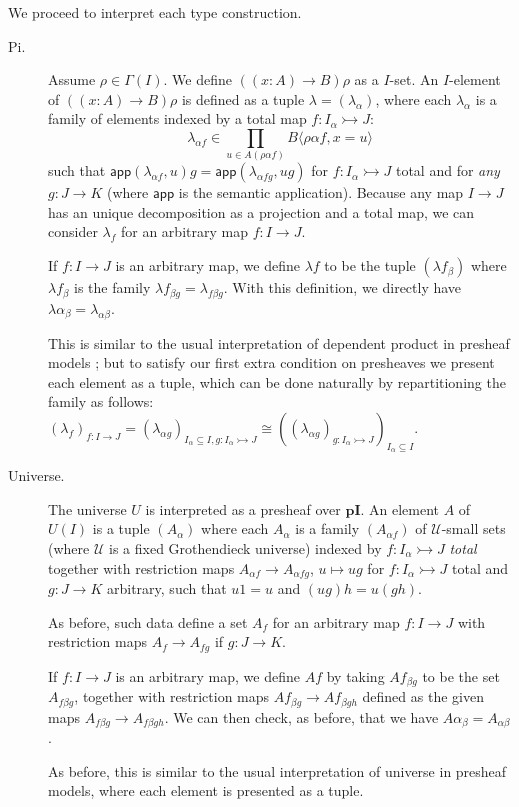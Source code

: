 \documentclass[english]{PaperTools/latex/entcs}
\theoremstyle{plain}
\theoremstyle{definition}
\theoremstyle{remark}
\def\pI{\ensuremath{\mathbf{pI}}}
\def\app#1#2{\mathsf{app}(#1,#2)}
\begin{document}
\smallskip
We proceed to interpret each type construction.
\begin{description}
  \item[\sc Pi.]
    Assume $ρ ∈ Γ(I)$. We define $((x:A) → B)ρ$ as a $I$-set.
    An $I$-element of $((x:A) → B)ρ$ is defined as a tuple $λ = (λ_α)$,
    where each $λ_α$ is a family of elements indexed by a total map $f : I_α ↣ J$:
    $$λ_{α f} ∈ \prod_{u ∈ A(ραf)} B⟨ραf,x=u⟩$$
    such that
    $\app{λ_{αf}}{u} g = \app{λ_{α fg}}{ug}$ for $f : I_α ↣ J$ total and
    for \emph{any} $g : J → K$ (where $\mathsf{app}$ is the semantic
    application).
    Because any map $I → J$ has an unique decomposition as a projection and a total
    map, we can consider $λ_f$ for an arbitrary map $f : I → J$.

    If $f : I → J$ is an arbitrary map, we define $λ f$ to be the tuple
    $(λf_β)$ where $λf_β$ is the family $λf_{βg} = λ_{fβg}$.
    With this definition, we directly have $λα_{β} = λ_{αβ}$.

    This is similar to the usual interpretation of dependent product in
    presheaf models \citep{Hofmann97syntaxand,bezem2014model}; but to
    satisfy our first extra condition on presheaves we present
    each element as a tuple, which can be done naturally by repartitioning
    the family as follows:
    $(λ_f)_{f : I → J} = (λ_{αg})_{I_α ⊆ I, g : I_α ↣ J} ≅
     ((λ_{αg})_{g : I_α ↣ J})_{I_α ⊆ I}$.


  \item[\sc Universe.]
    The universe $U$ is interpreted as a presheaf over \pI. An element $A$ of
    $U(I)$ is a tuple $(A_α)$ where each $A_α$ is a family $(A_{α f})$ of
    $\mathcal U$-small sets (where $\mathcal U$ is a fixed Grothendieck universe)
    indexed by $f : I_α ↣ J$ \emph{total} together with restriction
    maps $A_{α f} → A_{α fg}$, $u ↦ ug$ for $f : I_α ↣ J$ total
    and $g : J → K$ arbitrary, such that $u1 = u$ and $(ug)h = u(gh)$.

    As before, such data define a set $A_f$ for an arbitrary map $f : I → J$
    with restriction maps $A_f → A_{fg}$ if $g : J → K$.

    If $f : I → J$ is an arbitrary map, we define $Af$ by taking $Af_{βg}$
    to be the set $A_{fβg}$, together with restriction maps $Af_{βg} → Af_{βgh}$
    defined as the given maps $A_{fβg} → A_{fβgh}$.
    We can then check, as before, that we have $Aα_{β} = A_{αβ}$.

    As before, this is similar to the usual interpretation of universe in
    presheaf models, where each element is presented as a tuple.



\end{description}
\end{document}

